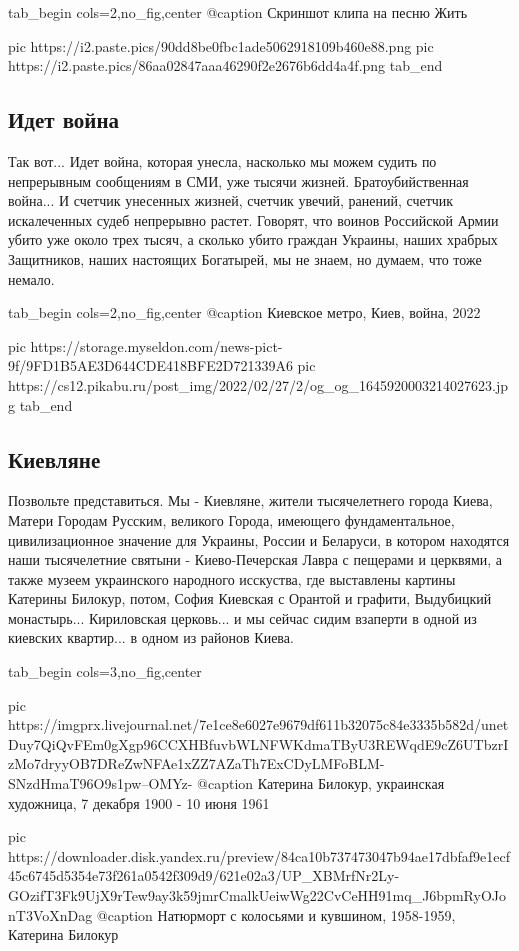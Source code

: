 \ifcmt
  tab_begin cols=2,no_fig,center
	   @caption Скриншот клипа на песню Жить

     pic https://i2.paste.pics/90dd8be0fbc1ade5062918109b460e88.png
		 pic https://i2.paste.pics/86aa02847aaa46290f2e2676b6dd4a4f.png
  tab_end
\fi

\subsection{Идет война}

Так вот... Идет война, которая унесла, насколько мы можем судить по непрерывным
сообщениям в СМИ, уже тысячи жизней. Братоубийственная война... И счетчик
унесенных жизней, счетчик увечий, ранений, счетчик искалеченных судеб
непрерывно растет. Говорят, что воинов Российской Армии убито уже около трех
тысяч, а сколько убито граждан Украины, наших храбрых Защитников, наших
настоящих Богатырей, мы не знаем, но думаем, что тоже немало. 

\ifcmt
  tab_begin cols=2,no_fig,center
		 @caption Киевское метро, Киев, война, 2022

		 pic https://storage.myseldon.com/news-pict-9f/9FD1B5AE3D644CDE418BFE2D721339A6
     pic https://cs12.pikabu.ru/post_img/2022/02/27/2/og_og_1645920003214027623.jpg
  tab_end
\fi

\subsection{Киевляне}

Позвольте представиться. Мы - Киевляне, жители тысячелетнего города Киева,
Матери Городам Русским, великого Города, имеющего фундаментальное,
цивилизационное значение для Украины, России и Беларуси, в котором находятся
наши тысячелетние святыни - Киево-Печерская Лавра с пещерами и церквями, а
также музеем украинского народного исскуства, где выставлены картины Катерины
Билокур, потом, София Киевская с Орантой и графити, Выдубицкий монастырь...
Кириловская церковь... и мы сейчас сидим взаперти в одной из киевских
квартир... в одном из районов Киева. 

\ifcmt
  tab_begin cols=3,no_fig,center

     pic https://imgprx.livejournal.net/7e1ce8e6027e9679df611b32075c84e3335b582d/unetDuy7QiQvFEm0gXgp96CCXHBfuvbWLNFWKdmaTByU3REWqdE9cZ6UTbzrIzMo7dryyOB7DReZwNFAe1xZZ7AZaTh7ExCDyLMFoBLM-SNzdHmaT96O9s1pw--OMYz-
		 @caption Катерина Билокур, украинская художница, 7 декабря 1900 - 10 июня 1961 

		 pic https://downloader.disk.yandex.ru/preview/84ca10b737473047b94ae17dbfaf9e1ecf45c6745d5354e73f261a0542f309d9/621e02a3/UP_XBMrfNr2Ly-GOzifT3Fk9UjX9rTew9ay3k59jmrCmalkUeiwWg22CvCeHH91mq_J6bpmRyOJonT3VoXnDag%
		 @caption Натюрморт с колосьями и кувшином, 1958-1959, Катерина Билокур

